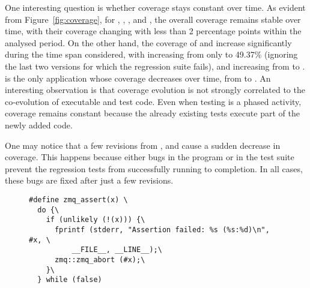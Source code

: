 One interesting question is whether coverage stays constant over time.
As evident from Figure~\ref{fig:coverage}, for \binutils, \git,
\memcached, and \redis, the overall coverage remains stable over time,
with their coverage changing with less than 2 percentage points within
the analysed period. On the other hand, the coverage of
\lighttpdtwo and \zeromq increase significantly during the time span
considered, with \lighttpdtwo increasing from only
\lighttpdtwoInitialCoverage to 49.37\% (ignoring the last two
versions for which the regression suite fails), and \zeromq increasing
from \zeromqInitialCoverage to \zeromqFinalCoverage. \beanstalkd is the only
application whose coverage decreases over time, from \beanstalkdInitialCoverage
to \beanstalkdFinalCoverage. An interesting observation is that coverage
evolution is not strongly correlated to the co-evolution of executable and test
code. Even when testing is a phased activity, coverage remains constant
because the already existing tests execute part of the newly added code.


One may notice that a few revisions from \lighttpdtwo, \memcached and \redis
cause a sudden decrease in coverage. This happens because either bugs in the
program or in the test suite prevent the regression tests from
successfully running to completion. In all cases, these bugs are fixed
after just a few revisions.

\begin{figure}[t]
\begin{lstlisting}[label=lst:zeromqassert,basicstyle=\footnotesize\ttfamily,xleftmargin=0pt,numbers=none,caption={Example of an assertion macro used in \zeromq codebase.}]
#define zmq_assert(x) \
  do {\
    if (unlikely (!(x))) {\
      fprintf (stderr, "Assertion failed: %s (%s:%d)\n", #x, \
          __FILE__, __LINE__);\
      zmq::zmq_abort (#x);\
    }\
  } while (false)
\end{lstlisting}
\end{figure}

